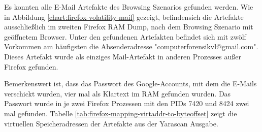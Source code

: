 Es konnten alle E-Mail Artefakte des Browsing Szenarios gefunden werden.
Wie in Abbildung \ref{chart:firefox-volatility-mail} gezeigt, befindensich die Artefakte ausschließlich im zweiten Firefox RAM Dump, nach dem Browsing Szenario mit geöffnetem Browser.
Unter den gefundenen Artefakten befindet sich mit zwölf Vorkommen am häufigsten die Absenderadresse "computerforensikvl@gmail.com". Dieses Artefakt wurde als einziges Mail-Artefakt in anderen Prozesses außer Firefox gefunden.

Bemerkenswert ist, dass das Passwort des Google-Accounts, mit dem die E-Mails verschickt wurden, vier mal als Klartext im RAM gefunden wurden. Das Passwort wurde in je zwei Firefox Prozessen mit den PIDs 7420 und 8424 zwei mal gefunden. Tabelle \ref{tab:firefox-mapping-virtaddr-to-byteoffset} zeigt die virtuellen Speicheradressen der Artefakte aus der Yarascan Ausgabe.
\begin{table}[]
\label{tab:firefox-mapping-virtaddr-to-byteoffset}
\caption{Abbildung der virtellen Speicheradressen im Firefox-RAM der gefundenen Strings auf Byte-Offsets der entsprechenden Speicherseiten}
\end{table}

